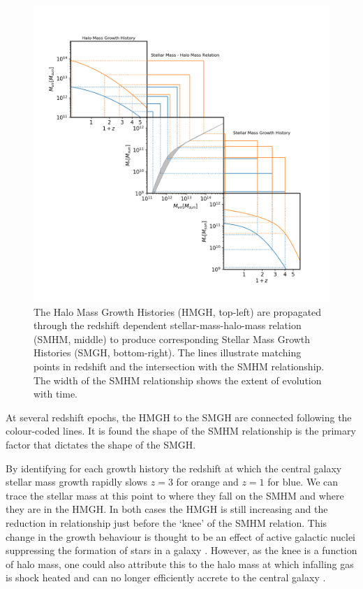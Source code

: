 \begin{figure}[h]
    \centering
    \includegraphics[width = \linewidth]{Figures/Chapter2/HMGH_to_SMGH.png}
    \caption{The Halo Mass Growth Histories (HMGH, top-left) are propagated through the redshift dependent stellar-mass-halo-mass relation (SMHM, middle) to produce corresponding Stellar Mass Growth Histories (SMGH, bottom-right). The lines illustrate matching points in redshift and the intersection with the SMHM relationship. The width of the SMHM relationship shows the extent of evolution with time.}
    \label{fig:Cent_Mass_PP}
\end{figure}

At several redshift epochs, the HMGH to the SMGH are connected following the colour-coded lines. It is found the shape of the SMHM relationship is the primary factor that dictates the shape of the SMGH. 


By identifying for each growth history the redshift at which the central galaxy stellar mass growth rapidly slows $z = 3$ for orange and $z = 1$ for blue. We can trace the stellar mass at this point to where they fall on the SMHM and where they are in the HMGH. In both cases the HMGH is still increasing and the reduction in  relationship just before the `knee' of the SMHM relation. This change in the growth behaviour is thought to be an effect of active galactic nuclei suppressing the formation of stars in a galaxy \cite[e.g.][]{Cattaneo2006ModellingMass, Barai2018QuasarGalaxies}. However, as the knee is a function of halo mass, one could also attribute this to the halo mass at which infalling gas is shock heated and can no longer efficiently accrete to the central galaxy \cite[e.g.][]{Cattaneo2006ModellingMass, Behroozi2013ONEFFICIENCY}.

